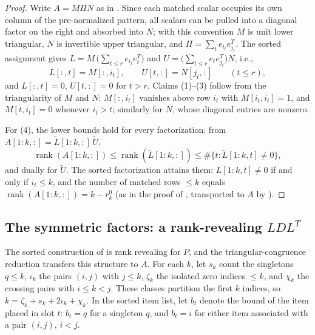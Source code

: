 \documentclass[preprint,12pt]{elsarticle}
\theoremstyle{plain}
\theoremstyle{nonumberplain}
\newtheorem{proof}{Proof}
\numberwithin{equation}{section}
\DeclareMathOperator{\rk}{rank}
\numberwithin{theorem}{section}
\begin{document}
\begin{proof}
  Write $A = M \Pi N$ as in .  Since each matched
  scalar occupies its own column of the pre-normalized pattern, all scalars
  can be pulled into a diagonal factor on the right and absorbed into $N$;
  with this convention $M$ is unit lower triangular, $N$ is invertible
  upper triangular, and $\Pi = \sum_t e_{i_t} e_{j_t}^T$.  The sorted
  assignment gives $L = M \, \bigl( \sum_{t \le r} e_{i_t} e_t^T \bigr)$
  and $U = \bigl( \sum_{t \le r} e_t e_{j_t}^T \bigr) N$, i.e.,
  \[
    L[:, t] = M[:, i_t],
    \qquad
    U[t, :] = N[j_t, :]
    \qquad (t \le r),
  \]
  and $L[:, t] = 0$, $U[t, :] = 0$ for $t > r$.  Claims (1)--(3) follow
  from the triangularity of $M$ and $N$: $M[:, i_t]$ vanishes above row
  $i_t$ with $M[i_t, i_t] = 1$, and $M[t, i_t] = 0$ whenever
  $i_t > t$; similarly for $N$, whose diagonal entries are nonzero.

  For (4), the lower bounds hold for every factorization: from
  $A[1:k,:] = \widetilde L[1:k,:] \, \widetilde U$,
  \[
    \rk(A[1:k,:]) \le \rk(\widetilde L[1:k,:])
    \le \#\{t \colon \widetilde L[1:k,t] \neq 0\},
  \]
  and dually for $\widetilde U$.  The sorted factorization attains them:
  $L[1:k, t] \neq 0$ if and only if $i_t \le k$, and the number of matched
  rows $\le k$ equals $\rk(A[1:k,:]) = k - r^0_k$ (as in the proof of
  , transported to $A$ by ).
\end{proof}

\subsection{The symmetric factors: a rank-revealing $LDL^T$}

The sorted construction of  is rank revealing for $P$, and the triangular-congruence reduction transfers this structure to $A$. For each $k$, let $s_k$ count the singletons $q\le k$, $\iota_k$ the pairs $(i,j)$ with $j\le k$, $\zeta_k$ the isolated zero indices $\le k$, and $\chi_k$ the crossing pairs with $i\le k<j$. These classes partition the first $k$ indices, so $k=\zeta_k+s_k+2\iota_k+\chi_k$. In the sorted item list, let $b_t$ denote the bound of the item placed in slot $t$: $b_t=q$ for a singleton $q$, and $b_t=i$ for either item associated with a pair $(i,j)$, $i<j$.
\end{document}
